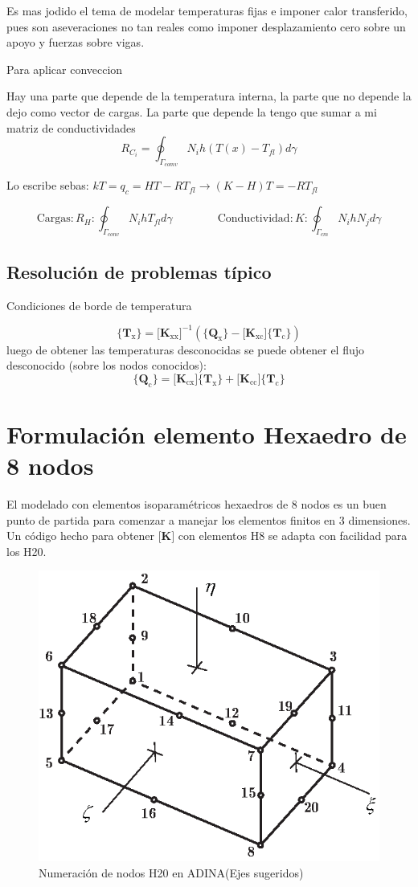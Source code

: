\documentclass[11pt, a4paper,titlepage]{article}
\newcommand{\Adina}{{\sc ADINA}}
\newcommand{\Mme}[1]{\boldsymbol{[}\mathbf{#1} \boldsymbol{]}}
\newcommand{\Cme}[1]{\boldsymbol{\{ }\mathbf{#1} \boldsymbol{\}} }
\newcommand{\MK}{\Mme{K}}
\begin{document}
Es mas jodido el tema de modelar temperaturas fijas e imponer calor transferido, pues son aseveraciones no tan reales como imponer desplazamiento cero sobre un apoyo y  fuerzas sobre vigas.

Para aplicar conveccion 

Hay una parte que depende de la temperatura interna, la parte que no depende la dejo como vector de cargas. La parte que depende la tengo que sumar a mi matriz de conductividades
\[
R_{C_{i}}=\oint_{\Gamma_{c o m v}} N_{i} h\left(T(x)-T_{f l}\right) d \gamma
\]

Lo escribe sebas: $kT=q_c = HT-RT_{fl} \longrightarrow (K-H)T = -R T_{fl}$

\[
\mathrm{Cargas:} R_{H} : \oint_{\Gamma_{c o n v}} N_{i} h T_{f l} d \gamma \qquad \qquad \mathrm{Conductividad:}  K : \oint_{\Gamma_{c m}} N_{i} h N_{j} d \gamma
\]


\subsection*{Resolución de problemas típico}

Condiciones de borde de temperatura

\[
\Cme{T_{\mathrm{x}}} = \Mme{K_{\mathrm{xx}}}^{-1} \left( \Cme{Q_\mathrm{x}}- \Mme{K_{\mathrm{xc}}}  \Cme{T_\mathrm{c}} \right)
\]
luego de obtener las temperaturas desconocidas se puede obtener el flujo desconocido (sobre los nodos conocidos):
\[
\Cme{Q_{\mathrm{c}}} = \Mme{K_{\mathrm{cx}}} \Cme{T_\mathrm{x}} + \Mme{K_{\mathrm{cc}}} \Cme{T_\mathrm{c}}  
\]





\section{Formulación elemento Hexaedro de 8 nodos}
\newcommand{\dof}{\ensuremath{\mathrm{dof}}}
El modelado con elementos isoparamétricos hexaedros de 8 nodos es un buen punto de partida para comenzar a manejar los elementos finitos en 3 dimensiones. Un código hecho para obtener $\MK$ con elementos H8 se adapta con facilidad para los H20.

\begin{figure}[htb!]
	\centering
	\includegraphics[width=.6\textwidth]{fig/H20numbering.eps}
	\caption{Numeración de nodos H20 en \Adina (Ejes sugeridos)}
	\label{fig:H20numbering}
\end{figure}
\end{document}
